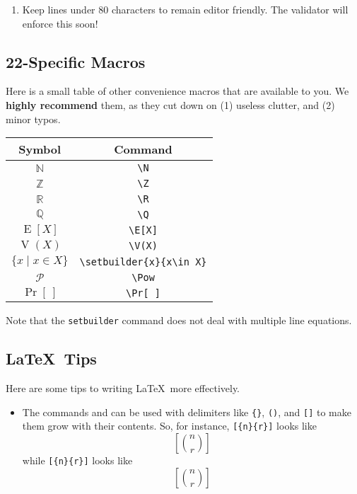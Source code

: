 {\begin{enumerate}
      \textbf{Wrong}: \texttt{3 4 5} compiles to $3\equiv 4\mod 5$, has weird spacing and we wish to maintain consistency.
      
      \textbf{Very Wrong}: \texttt{3=4 mod 5} compiles to $3=4 mod 5$ and will lead to spontaneous crying among the staff.   
    \item Keep lines under 80 characters to remain editor friendly.
      The validator will enforce this soon!
  \end{enumerate}
  
  \subsection{22-Specific Macros}
    Here is a small table of other convenience macros that are available to you. We \textbf{highly recommend} them, as they cut down on (1) useless clutter, and (2) minor typos.
    
    \begin{center}
      \begin{tabular}{|c|c|}
        \hline
        \textbf{Symbol} & \textbf{Command} \\\hline
        $\mathbb{N}$ & \texttt{\textbackslash N} \\\hline
        $\mathbb{Z}$ & \texttt{\textbackslash Z} \\\hline
        $\mathbb{R}$ & \texttt{\textbackslash R} \\\hline
        $\mathbb{Q}$ & \texttt{\textbackslash Q} \\\hline
        $\operatorname{E}[X]$ & \texttt{\textbackslash E[X]} \\\hline
        $\operatorname{V}(X)$ & \texttt{\textbackslash V(X)} \\\hline
        $\{x\;|\;x\in X\}$ & \texttt{\textbackslash setbuilder\{x\}\{x\textbackslash in\ X\}} \\\hline
        $\mathcal{P}$ & \texttt{\textbackslash Pow} \\\hline
        $\Pr[\ ]$ & \texttt{\textbackslash Pr[\ ]} \\\hline
      \end{tabular}
    \end{center}
    
    Note that the \texttt{setbuilder} command does not deal with multiple line equations.
  
  \subsection{\LaTeX\ Tips}
    Here are some tips to writing \LaTeX\ more effectively. 
    \begin{itemize}
      \item The commands  and  can be used with delimiters like \texttt{\{\}}, \texttt{()}, and \texttt{[]} to make them grow with their contents. So, for instance, \texttt{[\{n\}\{r\}]} looks like \[[\binom nr]\] while \texttt{[\{n\}\{r\}]} looks like \[\left[\binom nr\right]\]
      

\end{itemize}}
